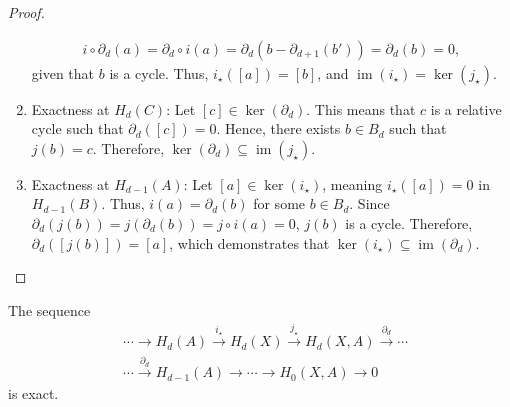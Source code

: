 \begin{proof}
\begin{enumerate}
		      \begin{align}
		      	i \circ \partial_{d}(a) = \partial_{d} \circ i(a) = \partial_{d}(b - \partial_{d+1}(b')) = \partial_{d}(b) = 0, 
		      \end{align}
		      given that \(b\) is a cycle. Thus, \(i_\star([a]) = [b]\), and \(\operatorname{im}(i_\star) = \ker(j_\star)\).
		\item Exactness at \(H_{d}(C)\): Let \([c] \in \ker(\partial_d)\). This means that \(c\) is a relative cycle such that \(\partial_d([c]) = 0\). Hence, there exists \(b \in B_{d}\) such that \(j(b) = c\). Therefore, \(\ker(\partial_d) \subseteq \operatorname{im}(j_\star)\).
		\item Exactness at \(H_{d-1}(A)\): Let \([a] \in \ker(i_\star)\), meaning \(i_\star([a]) = 0\) in \(H_{d-1}(B)\). Thus, \(i(a) = \partial_d(b)\) for some \(b \in B_d\). Since \(\partial_d(j(b)) = j(\partial_d(b)) = j \circ i(a) = 0\), \(j(b)\) is a cycle. Therefore, \(\partial_d([j(b)]) = [a]\), which demonstrates that \(\ker(i_\star) \subseteq \operatorname{im}(\partial_d)\).
	\end{enumerate}
\end{proof}

\begin{proposition}{\cite[p.117f]{hatcher2005algebraic}}
	The sequence
	\begin{align}
		  & \cdots \rightarrow H_{d}(A) \xrightarrow{i_\star}H_{d}(X) \xrightarrow{j_\star} 
		H_{d}(X,A) \xrightarrow{\partial_d} \cdots \\
		  & \cdots \xrightarrow{\partial_d} H_{d-1}(A) \rightarrow \cdots \rightarrow       
		H_{0}(X,A) \rightarrow 0
	\end{align}
	is exact.
\end{proposition}

